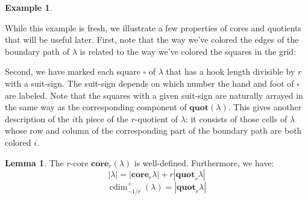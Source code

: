 \documentclass{amsart}[12pt]
\theoremstyle{definition}
\newtheorem{lemma}[dummy]{Lemma}
\newtheorem{example}[dummy]{Example}
\newcommand{\core}{\mathbf{core}}
\newcommand{\quot}{\mathbf{quot}}
\DeclareMathOperator{\cdim}{cdim}
\begin{document}
\begin{example}
\begin{center}
\end{center}
\end{example}

While this example is fresh, we illustrate a few properties of cores and quotients that will be useful later.  First, note that the way we've colored the edges of the boundary path of $\lambda$ is related to the way we've colored the squares in the grid:

Second, we have marked each square $\square$ of $\lambda$ that has a hook length divisible by $r$ with a suit-sign.  The suit-sign depends on which number the hand and foot of $\square$ are labeled.  Note that the squares with a given suit-sign are naturally arrayed in the same way as the corresponding component of $\quot(\lambda)$.  This gives another description of the $i$th piece of the $r$-quotient of $\lambda$: it consists of those cells of $\lambda$ whose row and column of the corresponding part of the boundary path are both colored $i$.  





\begin{lemma}
The $r$-core $\core_r(\lambda)$ is well-defined.  Furthermore, we have:
$$|\lambda|=|\core_r{\lambda}|+r|\quot_r{\lambda}|$$
$$\cdim^+_{-1/r}(\lambda)=|\quot_r{\lambda}|$$
\end{lemma}
\end{document}
